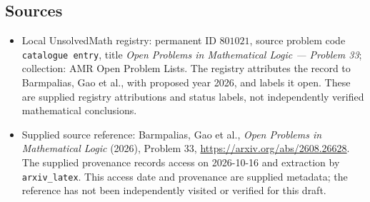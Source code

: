 \documentclass[11pt]{article}
\begin{document}
\subsection{Sources}
\begin{itemize}
\item Local UnsolvedMath registry: permanent ID \(801021\), source problem code \texttt{catalogue entry}, title \emph{Open Problems in Mathematical Logic --- Problem 33}; collection: AMR Open Problem Lists. The registry attributes the record to Barmpalias, Gao et al., with proposed year 2026, and labels it open. These are supplied registry attributions and status labels, not independently verified mathematical conclusions.
\item Supplied source reference: Barmpalias, Gao et al., \emph{Open Problems in Mathematical Logic} (2026), Problem 33, \url{https://arxiv.org/abs/2608.26628}. The supplied provenance records access on 2026-10-16 and extraction by \texttt{arxiv\_latex}. This access date and provenance are supplied metadata; the reference has not been independently visited or verified for this draft.
\end{itemize}
\end{document}
